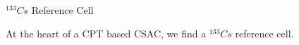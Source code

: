 \begin{frame}{$^{133}Cs$ Reference Cell}

    At the heart of a CPT based CSAC, we find a $^{133}Cs$ reference cell.

    \vspace{10pt}

    \begin{columns}[c, onlytextwidth]

        \begin{column}{0.45\textwidth}

            \begin{figure}
                \centering

\end{figure}
\end{column}
\end{columns}
\end{frame}
